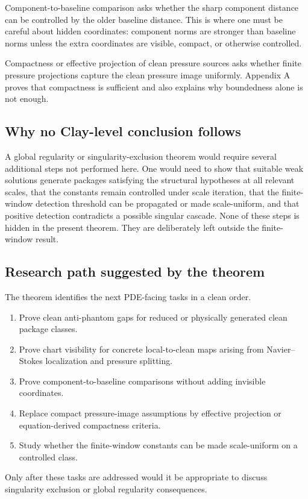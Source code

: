 \documentclass[11pt]{article}
\numberwithin{equation}{section}
\theoremstyle{definition}
\theoremstyle{remark}
\begin{document}
Component-to-baseline comparison asks whether the sharp component distance can be controlled by the older baseline distance.  This is where one must be careful about hidden coordinates: component norms are stronger than baseline norms unless the extra coordinates are visible, compact, or otherwise controlled.

Compactness or effective projection of clean pressure sources asks whether finite pressure projections capture the clean pressure image uniformly.  Appendix A proves that compactness is sufficient and also explains why boundedness alone is not enough.

\subsection*{Why no Clay-level conclusion follows}

A global regularity or singularity-exclusion theorem would require several additional steps not performed here.  One would need to show that suitable weak solutions generate packages satisfying the structural hypotheses at all relevant scales, that the constants remain controlled under scale iteration, that the finite-window detection threshold can be propagated or made scale-uniform, and that positive detection contradicts a possible singular cascade.  None of these steps is hidden in the present theorem.  They are deliberately left outside the finite-window result.

\subsection*{Research path suggested by the theorem}

The theorem identifies the next PDE-facing tasks in a clean order.
\begin{enumerate}[label=\textup{(\roman*)},leftmargin=*]
    \item Prove clean anti-phantom gaps for reduced or physically generated clean package classes.
    \item Prove chart visibility for concrete local-to-clean maps arising from Navier--Stokes localization and pressure splitting.
    \item Prove component-to-baseline comparisons without adding invisible coordinates.
    \item Replace compact pressure-image assumptions by effective projection or equation-derived compactness criteria.
    \item Study whether the finite-window constants can be made scale-uniform on a controlled class.
\end{enumerate}
Only after these tasks are addressed would it be appropriate to discuss singularity exclusion or global regularity consequences.
\end{document}
